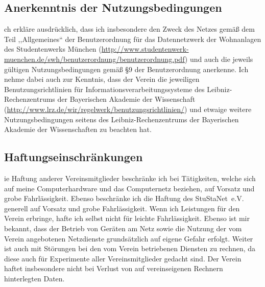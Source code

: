 \documentclass[a4paper,10pt]{scrartcl}
\begin{document}
\subsection*{Anerkenntnis der Nutzungsbedingungen}
ch erkläre ausdrücklich, dass ich insbesondere den Zweck des Netzes gemäß dem Teil ,,Allgemeines`` der Benutzerordnung für das Datennetzwerk der Wohnanlagen des Studentenwerks München (\url{http://www.studentenwerk-muenchen.de/swh/benutzerordnung/benutzerordnung.pdf}) und auch die jeweils gültigen Nutzungsbedingungen gemäß §9 der Benutzerordnung anerkenne. Ich nehme dabei auch zur Kenntnis, dass der Verein die jeweiligen Benutzungsrichtlinien für Informationsverarbeitungssysteme des Leibniz-Rechenzentrums der Bayerischen Akademie der Wissenschaft (\url{http://www.lrz.de/wir/regelwerk/benutzungsrichtlinien/}) und etwaige weitere Nutzungsbedingungen seitens des Leibniz-Rechenzentrums der Bayerischen Akademie der Wissenschaften zu beachten hat.

\subsection*{Haftungseinschränkungen}
ie Haftung anderer Vereinsmitglieder beschränke ich bei Tätigkeiten, welche sich auf meine Computerhardware und das Computernetz beziehen, auf Vorsatz und grobe Fahrlässigkeit. Ebenso beschränke ich die Haftung des StuStaNet~e.V. generell auf Vorsatz und grobe Fahrlässigkeit. Wenn ich Leistungen für den Verein erbringe, hafte ich selbst nicht für leichte Fahrlässigkeit. Ebenso ist mir bekannt, dass der Betrieb von Geräten am Netz sowie die Nutzung der vom Verein angebotenen Netzdienste grundsätzlich auf eigene Gefahr erfolgt. Weiter ist auch mit Störungen bei den vom Verein betriebenen Diensten zu rechnen, da diese auch für Experimente aller Vereinsmitglieder gedacht sind. Der Verein haftet insbesondere nicht bei Verlust von auf vereinseigenen Rechnern hinterlegten Daten.
\end{document}
